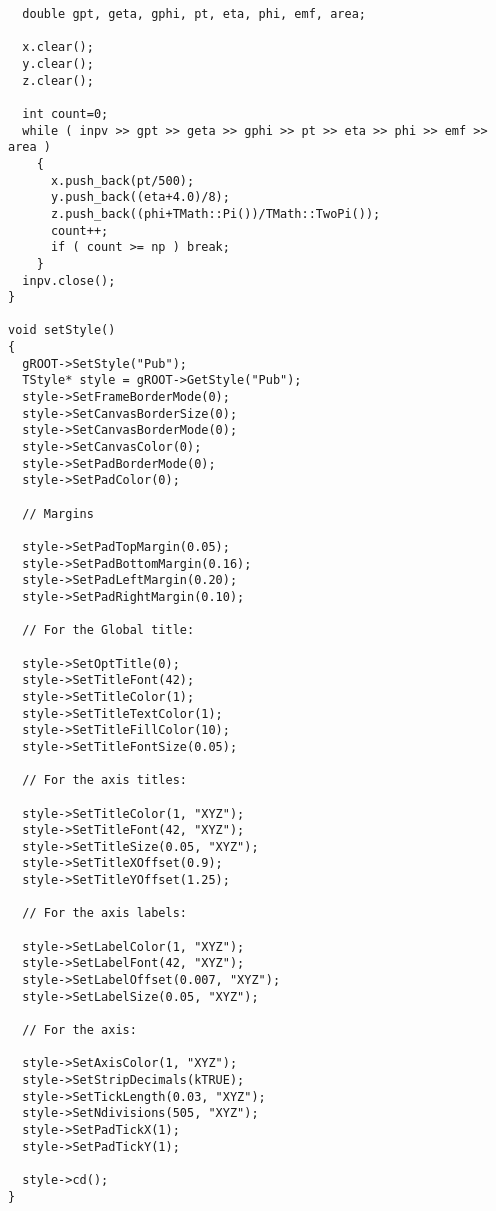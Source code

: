\begin{verbatim}
  double gpt, geta, gphi, pt, eta, phi, emf, area;
  
  x.clear();
  y.clear();
  z.clear();

  int count=0;
  while ( inpv >> gpt >> geta >> gphi >> pt >> eta >> phi >> emf >> area )
    { 
      x.push_back(pt/500);
      y.push_back((eta+4.0)/8);
      z.push_back((phi+TMath::Pi())/TMath::TwoPi());
      count++;
      if ( count >= np ) break;
    }
  inpv.close();
}

void setStyle()
{
  gROOT->SetStyle("Pub");
  TStyle* style = gROOT->GetStyle("Pub");
  style->SetFrameBorderMode(0);
  style->SetCanvasBorderSize(0);
  style->SetCanvasBorderMode(0);
  style->SetCanvasColor(0);
  style->SetPadBorderMode(0);
  style->SetPadColor(0);

  // Margins

  style->SetPadTopMargin(0.05);
  style->SetPadBottomMargin(0.16);
  style->SetPadLeftMargin(0.20);
  style->SetPadRightMargin(0.10);

  // For the Global title:

  style->SetOptTitle(0);
  style->SetTitleFont(42);
  style->SetTitleColor(1);
  style->SetTitleTextColor(1);
  style->SetTitleFillColor(10);
  style->SetTitleFontSize(0.05);

  // For the axis titles:

  style->SetTitleColor(1, "XYZ");
  style->SetTitleFont(42, "XYZ");
  style->SetTitleSize(0.05, "XYZ");
  style->SetTitleXOffset(0.9);
  style->SetTitleYOffset(1.25);

  // For the axis labels:

  style->SetLabelColor(1, "XYZ");
  style->SetLabelFont(42, "XYZ");
  style->SetLabelOffset(0.007, "XYZ");
  style->SetLabelSize(0.05, "XYZ");

  // For the axis:

  style->SetAxisColor(1, "XYZ");
  style->SetStripDecimals(kTRUE);
  style->SetTickLength(0.03, "XYZ");
  style->SetNdivisions(505, "XYZ");
  style->SetPadTickX(1);  
  style->SetPadTickY(1);

  style->cd();
}
\end{verbatim}
\normalsize
 